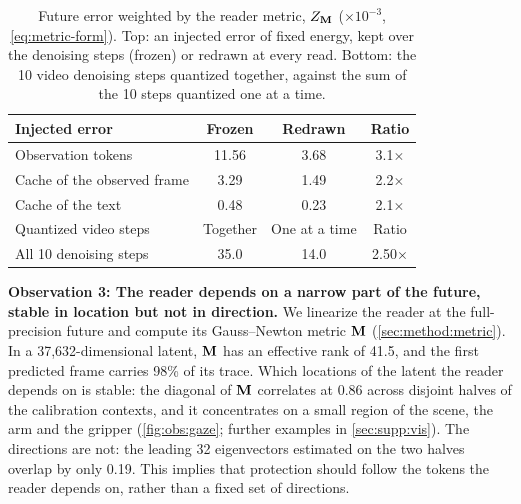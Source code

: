 \begin{table}[t]
  \centering
  \small
  \setlength{\tabcolsep}{5pt}
  \begin{tabular}{@{}lccc@{}}
    \toprule
    Injected error & Frozen & Redrawn & Ratio \\
    \midrule
    Observation tokens          & 11.56 & 3.68 & 3.1$\times$ \\
    Cache of the observed frame & 3.29  & 1.49 & 2.2$\times$ \\
    Cache of the text           & 0.48  & 0.23 & 2.1$\times$ \\
    \midrule
    Quantized video steps & Together & One at a time & Ratio \\
    \midrule
    All 10 denoising steps      & 35.0  & 14.0 & 2.50$\times$ \\
    \bottomrule
  \end{tabular}
  \caption{Future error weighted by the reader metric, $Z_{\mathbf{M}}$ ($\times 10^{-3}$, \cref{eq:metric-form}).
  Top: an injected error of fixed energy, kept over the denoising steps (frozen) or redrawn at every read.
  Bottom: the 10 video denoising steps quantized together, against the sum of the 10 steps quantized one at a time.}
  \label{tab:obs:reads}
\end{table}

\noindent\textbf{Observation 3: The reader depends on a narrow part of the future, stable in location but not in direction.}
We linearize the reader at the full-precision future and compute its Gauss--Newton metric $\mathbf{M}$ (\cref{sec:method:metric}).
In a 37{,}632-dimensional latent, $\mathbf{M}$ has an effective rank of 41.5, and the first predicted frame carries 98\% of its trace.
Which locations of the latent the reader depends on is stable: the diagonal of $\mathbf{M}$ correlates at 0.86 across disjoint halves of the calibration contexts, and it concentrates on a small region of the scene, the arm and the gripper (\cref{fig:obs:gaze}; further examples in \cref{sec:supp:vis}).
The directions are not: the leading 32 eigenvectors estimated on the two halves overlap by only 0.19.
This implies that protection should follow the tokens the reader depends on, rather than a fixed set of directions.
